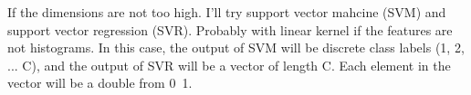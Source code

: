 If the dimensions are not too high.
I'll try support vector mahcine (SVM) and support vector regression (SVR).
Probably with linear kernel if the features are not histograms.
In this case, the output of SVM will be discrete class labels (1, 2, ... C),
and the output of SVR will be a vector of length C. Each element in the
vector will be a double from 0~1.